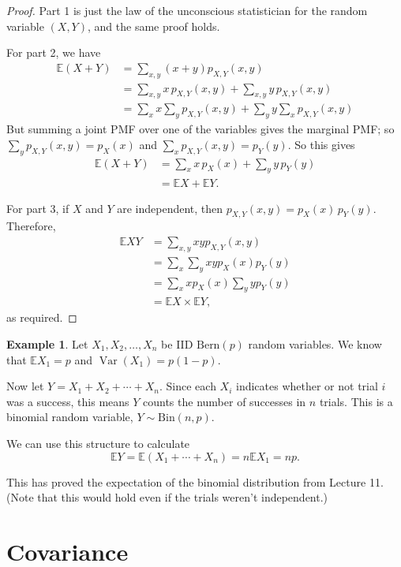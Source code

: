 \documentclass[
  a4paper,
]{book}
\theoremstyle{definition}
\theoremstyle{definition}
\newtheorem{example}{Example}[chapter]
\theoremstyle{definition}
\theoremstyle{definition}
\theoremstyle{remark}
\begin{document}
\begin{proof}
Part 1 is just the law of the unconscious statistician for the random variable \((X,Y)\), and the same proof holds.

For part 2, we have
\begin{align*}
\mathbb E(X + Y) &= \sum_{x,y} (x + y)p_{X,Y}(x,y) \\
  &= \sum_{x,y} x\,p_{X,Y}(x,y) + \sum_{x,y} y\,p_{X,Y}(x,y) \\
  &= \sum_x x \sum_y p_{X,Y}(x,y) + \sum_y y \sum_x p_{X,Y}(x,y)
\end{align*}
But summing a joint PMF over one of the variables gives the marginal PMF; so \(\sum_y p_{X,Y}(x,y) = p_X(x)\) and \(\sum_x p_{X,Y}(x,y) = p_Y(y)\). So this gives
\begin{align*}
\mathbb E(X + Y) &= \sum_x x\, p_X(x) + \sum_y y\,p_Y(y) \\
&= \mathbb EX + \mathbb EY .
\end{align*}

For part 3, if \(X\) and \(Y\) are independent, then \(p_{X,Y}(x,y) = p_X(x) \, p_Y(y)\). Therefore,
\begin{align*}
\mathbb EXY &= \sum_{x,y} xy p_{X,Y}(x,y) \\
  &= \sum_x \sum_y xy p_X(x) p_Y(y) \\
  &= \sum_x x p_X(x) \sum_y y p_Y(y) \\
  &= \mathbb EX \times \mathbb EY,
\end{align*}
as required.
\end{proof}

\begin{example}
Let \(X_1, X_2, \dots, X_n\) be IID \(\text{Bern}(p)\) random variables. We know that \(\mathbb EX_1 = p\) and \(\operatorname{Var}(X_1) = p(1-p)\).

Now let \(Y = X_1 + X_2 + \cdots + X_n\). Since each \(X_i\) indicates whether or not trial \(i\) was a success, this means \(Y\) counts the number of successes in \(n\) trials. This is a binomial random variable, \(Y \sim \text{Bin}(n,p)\).

We can use this structure to calculate
\[ \mathbb EY = \mathbb E(X_1 + \cdots + X_n) = n \mathbb EX_1 = np . \]

This has proved the expectation of the binomial distribution from Lecture 11. (Note that this would hold even if the trials weren't independent.)
\end{example}

\hypertarget{covariance}{%
\section{Covariance}\label{covariance}}
\end{document}
